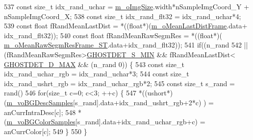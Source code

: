 \begin{DoxyCode}
537                 \textcolor{keyword}{const} \textcolor{keywordtype}{size\_t} idx\_rand\_uchar = \mbox{\hyperlink{class_background_subtractor_l_b_s_p_a732d5e6ae35fb0e858cadb3af5ce08a2}{m\_oImgSize}}.width*nSampleImgCoord\_Y + 
      nSampleImgCoord\_X;
538                 \textcolor{keyword}{const} \textcolor{keywordtype}{size\_t} idx\_rand\_flt32 = idx\_rand\_uchar*4;
539                 \textcolor{keyword}{const} \textcolor{keywordtype}{float} fRandMeanLastDist = *((\textcolor{keywordtype}{float}*)(\mbox{\hyperlink{class_background_subtractor_su_b_s_e_n_s_e_ad95bb91ff7ef9db725772b37d679e1a2}{m\_oMeanLastDistFrame}}.data+
      idx\_rand\_flt32));
540                 \textcolor{keyword}{const} \textcolor{keywordtype}{float} fRandMeanRawSegmRes = *((\textcolor{keywordtype}{float}*)(
      \mbox{\hyperlink{class_background_subtractor_su_b_s_e_n_s_e_a3c9fd9cf995eb9a7b4006467ab874958}{m\_oMeanRawSegmResFrame\_ST}}.data+idx\_rand\_flt32));
541                 \textcolor{keywordflow}{if}((n\_rand%
542                     || (fRandMeanRawSegmRes>\mbox{\hyperlink{_background_subtractor_su_b_s_e_n_s_e_8cpp_aa6ad1e76fe6a12c04328c5541d44ebcb}{GHOSTDET\_S\_MIN}} && fRandMeanLastDist<
      \mbox{\hyperlink{_background_subtractor_su_b_s_e_n_s_e_8cpp_aa1fa68710898742a17b61ace30b21120}{GHOSTDET\_D\_MAX}} && (n\_rand%
      0)) \{
543                     \textcolor{keyword}{const} \textcolor{keywordtype}{size\_t} idx\_rand\_uchar\_rgb = idx\_rand\_uchar*3;
544                     \textcolor{keyword}{const} \textcolor{keywordtype}{size\_t} idx\_rand\_ushrt\_rgb = idx\_rand\_uchar\_rgb*2;
545                     \textcolor{keyword}{const} \textcolor{keywordtype}{size\_t} s\_rand = rand()%
546                     \textcolor{keywordflow}{for}(\textcolor{keywordtype}{size\_t} c=0; c<3; ++c) \{
547                         *((ushort*)(\mbox{\hyperlink{class_background_subtractor_su_b_s_e_n_s_e_a422cc2f2a25c07efca02087bd6fe3d6d}{m\_voBGDescSamples}}[s\_rand].data+idx\_rand\_ushrt\_rgb+2*c)
      ) = anCurrIntraDesc[c];
548                         *(\mbox{\hyperlink{class_background_subtractor_su_b_s_e_n_s_e_a9d4d4bb930b34745536b9862683bb539}{m\_voBGColorSamples}}[s\_rand].data+idx\_rand\_uchar\_rgb+c) = 
      anCurrColor[c];
549                     \}
550                 \}

\end{DoxyCode}
